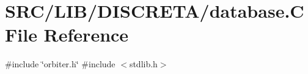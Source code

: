 \hypertarget{database_8_c}{}\section{S\+R\+C/\+L\+I\+B/\+D\+I\+S\+C\+R\+E\+T\+A/database.C File Reference}
\label{database_8_c}
{\ttfamily \#include \char`\"{}orbiter.\+h\char`\"{}}\newline
{\ttfamily \#include $<$stdlib.\+h$>$}\newline
